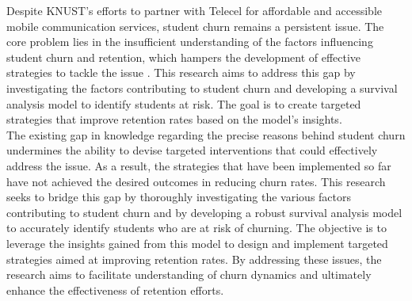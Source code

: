 \documentclass[doublespacing,12pt]{report}
\begin{document}
Despite KNUST's efforts to partner with Telecel for affordable and accessible mobile communication services, student churn remains a persistent issue. The core problem lies in the insufficient understanding of the factors influencing student churn and retention, which hampers the development of effective strategies to tackle the issue \cite{kapur2018}. This research aims to address this gap by investigating the factors contributing to student churn and developing a survival analysis model to identify students at risk. The goal is to create targeted strategies that improve retention rates based on the model's insights.\\
The existing gap in knowledge regarding the precise reasons behind student churn undermines the ability to devise targeted interventions that could effectively address the issue. As a result, the strategies that have been implemented so far have not achieved the desired outcomes in reducing churn rates. This research seeks to bridge this gap by thoroughly investigating the various factors contributing to student churn and by developing a robust survival analysis model to accurately identify students who are at risk of churning. The objective is to leverage the insights gained from this model to design and implement targeted strategies aimed at improving retention rates. By addressing these issues, the research aims to facilitate understanding of churn dynamics and ultimately enhance the effectiveness of retention efforts.
\end{document}
